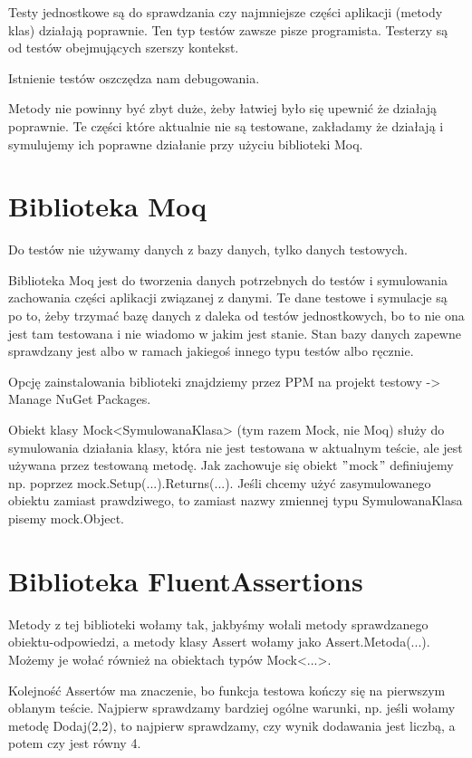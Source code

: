 \documentclass[10pt]{article}
\begin{document}
Testy jednostkowe są do sprawdzania czy najmniejsze części aplikacji (metody klas) działają poprawnie. Ten typ testów zawsze pisze programista. Testerzy są od testów obejmujących szerszy kontekst.

Istnienie testów oszczędza nam debugowania.

Metody nie powinny być zbyt duże, żeby łatwiej było się upewnić że działają poprawnie. Te części które aktualnie nie są testowane, zakładamy że działają i symulujemy ich poprawne działanie przy użyciu biblioteki Moq.

\section{Biblioteka Moq}
Do testów nie używamy danych z bazy danych, tylko danych testowych.

Biblioteka Moq jest do tworzenia danych potrzebnych do testów i symulowania zachowania części aplikacji związanej z danymi. Te dane testowe i symulacje są po to, żeby trzymać bazę danych z daleka od testów jednostkowych, bo to nie ona jest tam testowana i nie wiadomo w jakim jest stanie. Stan bazy danych zapewne sprawdzany jest albo w ramach jakiegoś innego typu testów albo ręcznie.

Opcję zainstalowania biblioteki znajdziemy przez PPM na projekt testowy -> Manage NuGet Packages.

Obiekt klasy Mock<SymulowanaKlasa> (tym razem Mock, nie Moq) służy do symulowania działania klasy, która nie jest testowana w aktualnym teście, ale jest używana przez testowaną metodę. Jak zachowuje się obiekt $"$mock$"$ definiujemy np. poprzez mock.Setup(...).Returns(...). Jeśli chcemy użyć zasymulowanego obiektu zamiast prawdziwego, to zamiast nazwy zmiennej typu SymulowanaKlasa pisemy mock.Object.

\section{Biblioteka FluentAssertions}
Metody z tej biblioteki wołamy tak, jakbyśmy wołali metody sprawdzanego obiektu-odpowiedzi, a metody klasy Assert wołamy jako Assert.Metoda(...). Możemy je wołać również na obiektach typów Mock<...>.

Kolejność Assertów ma znaczenie, bo funkcja testowa kończy się na pierwszym oblanym teście. Najpierw sprawdzamy bardziej ogólne warunki, np. jeśli wołamy metodę Dodaj(2,2), to najpierw sprawdzamy, czy wynik dodawania jest liczbą, a potem czy jest równy 4.
\end{document}
